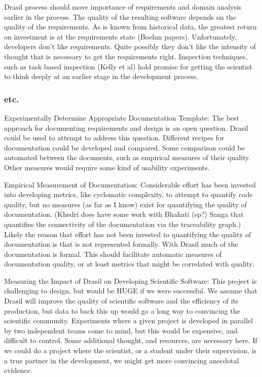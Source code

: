 \documentclass[12pt]{article}
\begin{document}
Drasil process should move importance of requirements and domain analysis
earlier in the process.  The quality of the resulting software depends on the
quality of the requirements.  As is known from historical data, the greatest
return on investment is at the requirements state (Boehm papers).
Unfortunately, developers don't like requirements.  Quite possibly they don't
like the intensity of thought that is necessary to get the requirements right.
Inspection techniques, such as task based inspection (Kelly et al) hold promise
for getting the scientist to think deeply at an earlier stage in the development
process.

\subsubsection{etc.}

Experimentally Determine Appropriate Documentation Template: The best approach
for documenting requirements and design is an open question.  Drasil could be
used to attempt to address this question.  Different recipes for documentation
could be developed and compared.  Some comparison could be automated between the
documents, such as empirical measures of their quality.  Other measures would
require some kind of usability experiments.

Empirical Measurement of Documentation: Considerable effort has been invested
into developing metrics, like cyclomatic complexity, to attempt to quantify code
quality, but no measures (as far as I know) exist for quantifying the quality of
documentation.  (Khedri does have some work with Bhahati (sp?) Sanga that
quantifies the connectivity of the documentation via the traceability graph.)
Likely the reason that effort has not been invested to quantifying the quality
of documentation is that is not represented formally.  With Drasil much of the
documentation is formal.  This should facilitate automatic measures of
documentation quality, or at least metrics that might be correlated with
quality.

Measuring the Impact of Drasil on Developing Scientific Software: This project
is challenging to design, but would be HUGE if we were successful.  We assume
that Drasil will improve the quality of scientific software and the efficiency
of its production, but data to back this up would go a long way to convincing
the scientific community.  Experiments where a given project is developed in
parallel by two independent teams come to mind, but this would be expensive, and
difficult to control.  Some additional thought, and resources, are necessary
here.  If we could do a project where the scientist, or a student under their
supervision, is a true partner in the development, we might get more convincing
anecdotal evidence.
\end{document}
